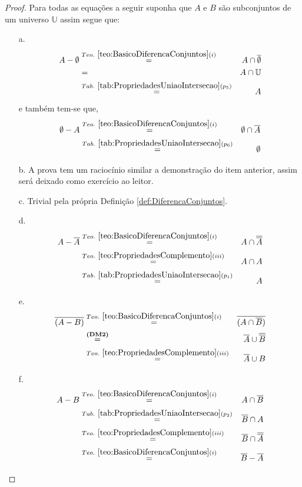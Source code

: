 \begin{proof}
	Para todas as equações a seguir suponha que $A$ e $B$ são subconjuntos de um universo $\mathbb{U}$ assim segue que:
	\begin{itemize}
		\item[a.] 
		\begin{eqnarray*}
			A - \emptyset & \stackrel{Teo. \  \ref{teo:BasicoDiferencaConjuntos}(i)}{=}& A \cap \overline{\emptyset} \\
			& = & A \cap \mathbb{U} \\
			& \stackrel{Tab. \ \ref{tab:PropriedadesUniaoIntersecao}(p_5)}{=} & A
		\end{eqnarray*}
		e também tem-se que, 
		\begin{eqnarray*}
			\emptyset - A &\stackrel{Teo. \  \ref{teo:BasicoDiferencaConjuntos}(i)}{=}& \emptyset \cap \overline{A}\\
			&\stackrel{Tab. \ \ref{tab:PropriedadesUniaoIntersecao}(p_6)}{=}& \emptyset
		\end{eqnarray*}
		
		\item[b.] A prova tem um raciocínio similar a demonstração do item anterior, assim será deixado como exercício ao leitor.
		\item[c.] Trivial pela própria Definição \ref{def:DiferencaConjuntos}.
		\item[d.] 
		\begin{eqnarray*}
			A - \overline{A} &\stackrel{Teo. \  \ref{teo:BasicoDiferencaConjuntos}(i)}{=}& A \cap \overline{\overline{A}}\\ 
			&\stackrel{Teo. \ \ref{teo:PropriedadesComplemento}(iii)}{=}& A \cap A\\
			&\stackrel{Tab. \ \ref{tab:PropriedadesUniaoIntersecao}(p_1)}{=}& A
		\end{eqnarray*} 
		\item[e.] 
		\begin{eqnarray*}
			\overline{(A - B)} &\stackrel{Teo. \  \ref{teo:BasicoDiferencaConjuntos}(i)}{=}& \overline{(A \cap \overline{B})}\\
			&\stackrel{\textbf{(DM2)}}{=}& \overline{A} \cup \overline{\overline{B}}\\
			&\stackrel{Teo. \ \ref{teo:PropriedadesComplemento}(iii)}{=}&  \overline{A} \cup  B
		\end{eqnarray*}
		\item[f.] 
		\begin{eqnarray*}
			A - B &\stackrel{Teo. \  \ref{teo:BasicoDiferencaConjuntos}(i)}{=}& A \cap \overline{B}\\
			&\stackrel{Tab. \ \ref{tab:PropriedadesUniaoIntersecao}(p_2)}{=}& \overline{B} \cap A\\
			&\stackrel{Teo. \ \ref{teo:PropriedadesComplemento}(iii)}{=}& \overline{B} \cap \overline{\overline{A}}\\
			&\stackrel{Teo. \  \ref{teo:BasicoDiferencaConjuntos}(i)}{=}&  \overline{B} - \overline{A}
		\end{eqnarray*}
	\end{itemize}
\end{proof}

